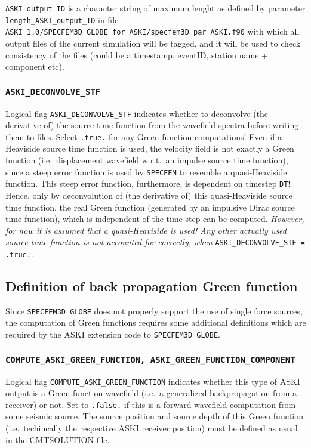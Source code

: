 \documentclass[12pt,a4paper]{article}
\newcommand{\lcode}[1]{\nolinkurl{#1}}
\newcommand{\ASKI}{ {\ttfamily ASKI} }
\begin{document}
\lcode{ASKI_output_ID} is a character
string of maximum lenght as defined by parameter \lcode{length_ASKI_output_ID} in file\\
\lcode{ASKI_1.0/SPECFEM3D_GLOBE_for_ASKI/specfem3D_par_ASKI.f90} 
with which all output files of the current simulation will be tagged, and it will be used to check consistency 
of the files (could be a timestamp, eventID, station name + component etc).

\subsubsection*{\lcode{ASKI_DECONVOLVE_STF}}
Logical flag \lcode{ASKI_DECONVOLVE_STF} indicates whether to deconvolve (the derivative of) the source time 
function from the wavefield spectra before writing them to files. Select \lcode{.true.} for any Green function computations!
Even if a Heaviside source time function is used, the velocity field is not exactly a Green function (i.e.\ displacement 
wavefield w.r.t.\ an impulse source time function), since a steep error function is used by \lcode{SPECFEM} to resemble 
a quasi-Heaviside function. This steep error function, furthermore, is dependent on timestep \lcode{DT}! 
Hence, only by deconvolution of (the derivative of) this quasi-Heaviside source time function, the real Green function 
(generated by an impulsive Dirac source time function), which is independent of the time step can be computed.
\emph{However, for now it is assumed that a quasi-Heaviside is used! Any other actually used source-time-function 
is not accounted for correctly, when} \lcode{ASKI_DECONVOLVE_STF = .true.}.

\subsection{Definition of back propagation Green function}
Since \lcode{SPECFEM3D_GLOBE} does not properly support the use of single force sources,
the computation of Green functions requires some additional definitions which
are required by the \ASKI extension code to \lcode{SPECFEM3D_GLOBE}.

\subsubsection*{\lcode{COMPUTE_ASKI_GREEN_FUNCTION, ASKI_GREEN_FUNCTION_COMPONENT}}
Logical flag \lcode{COMPUTE_ASKI_GREEN_FUNCTION} indicates whether this type of \ASKI output is a Green 
function wavefield (i.e.\ a generalized backpropagation from a receiver) or not. Set to \lcode{.false.} if this 
is a forward wavefield computation from some seismic source.
The source position and source depth of this Green function (i.e.\ techincally the respective \ASKI receiver 
position) must be defined as usual in the CMTSOLUTION file.
\end{document}
